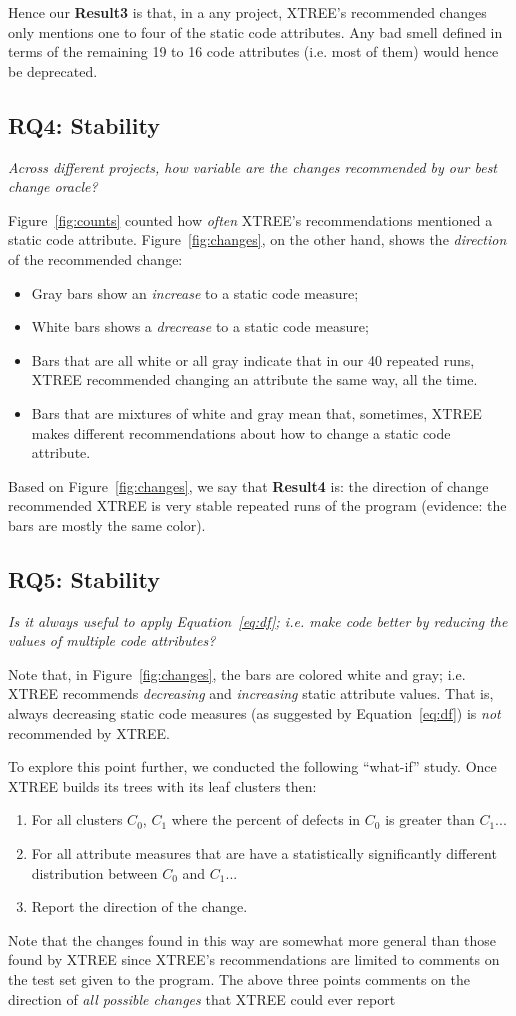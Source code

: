 \documentclass[twocolumn,5p]{elsarticle}
\newcommand{\bi}{\begin{itemize}[leftmargin=0.4cm]}
\newcommand{\ei}{\end{itemize}}
\newcommand{\be}{\begin{enumerate}}
\newcommand{\ee}{\end{enumerate}}
\newcommand{\fig}[1]{Figure~\ref{fig:#1}}
\newcommand{\eq}[1]{Equation~\ref{eq:#1}}
\theoremstyle{break}
\begin{document}
\begin{itemize}
Hence our {\bf Result3} is that, in a any  project,  XTREE’s  recommended  changes  only  mentions one to four 
of the  static code attributes.  Any bad smell defined in terms of the remaining 19 to 16 code attributes (i.e. most of them)
would hence be deprecated.


\subsection{RQ4: Stability}

{\em Across different projects, how variable are the changes recommended by our best change oracle? }


\fig{counts} counted how {\em often} XTREE's recommendations mentioned a static code attribute.
\fig{changes}, on the other hand, shows the {\em direction} of the recommended change:
\bi
\item Gray bars show  an  {\em increase} to a static code measure;
\item White bars shows a   {\em drecrease} to a static code measure;
\item Bars that are all white or all gray indicate that in our 40 repeated runs, XTREE recommended changing an attribute the same way, all the time.
\item Bars that are mixtures of white and gray mean that, sometimes, XTREE makes different recommendations about how to change a static
code attribute.
\ei
Based on \fig{changes}, we say that {\bf Result4} is: the direction of change recommended  XTREE is  very stable repeated runs of the program  (evidence:
the bars are mostly the same color).


\subsection{RQ5: Stability}

{\em  Is  it  always  useful  to  apply \eq{df};  i.e.   make  code  better  by  reducing  the  values  of multiple code attributes?

Note that, in \fig{changes}, the bars are colored white and gray; i.e. XTREE recommends {\em decreasing} and {\em increasing} 
static attribute values. That is, always decreasing static code measures (as suggested by \eq{df}) is {\em not} recommended by XTREE.

To explore this point further, we conducted the following ``what-if'' study. Once XTREE builds its trees with its leaf clusters then:
\be
\item For all clusters $C_0$, $C_1$ where the percent of defects in $C_0$ is greater than $C_1$...
\item For all attribute measures that are have a statistically significantly different distribution  between $C_0$ and $C_1$...
\item Report the direction of the change.
\ee
Note that the changes found in this way are somewhat more general than those found by XTREE since XTREE's recommendations are limited
to comments on the test set given to the program. The above three points comments on the direction of {\em all possible changes}
that XTREE could ever report


}
\end{itemize}
\end{document}
